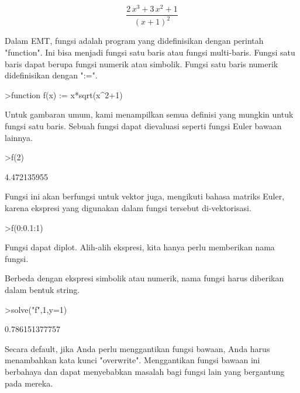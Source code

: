 \documentclass[12pt,arial,letterpaper]{book}
\begin{document}
\begin{eulercomment}
\begin{eulercomment}
\begin{eulerformula}
\[
\frac{2\,x^3+3\,x^2+1}{\left(x+1\right)^2}
\]
\end{eulerformula}
\begin{eulercomment}
Dalam EMT, fungsi adalah program yang didefinisikan dengan perintah
"function". Ini bisa menjadi fungsi satu baris atau fungsi
multi-baris. Fungsi satu baris dapat berupa fungsi numerik atau
simbolik. Fungsi satu baris numerik didefinisikan dengan ":=".
\end{eulercomment}
\begin{eulerprompt}
>function f(x) := x*sqrt(x^2+1)
\end{eulerprompt}
\begin{eulercomment}
Untuk gambaran umum, kami menampilkan semua definisi yang mungkin
untuk fungsi satu baris. Sebuah fungsi dapat dievaluasi seperti fungsi
Euler bawaan lainnya.
\end{eulercomment}
\begin{eulerprompt}
>f(2)
\end{eulerprompt}
\begin{euleroutput}
  4.472135955
\end{euleroutput}
\begin{eulercomment}
Fungsi ini akan berfungsi untuk vektor juga, mengikuti bahasa matriks
Euler, karena ekspresi yang digunakan dalam fungsi tersebut
di-vektorisasi.
\end{eulercomment}
\begin{eulerprompt}
>f(0:0.1:1)
\end{eulerprompt}
\begin{euleroutput}
  [0,  0.100499,  0.203961,  0.313209,  0.430813,  0.559017,  0.699714,
  0.854459,  1.0245,  1.21083,  1.41421]
\end{euleroutput}
\begin{eulercomment}
Fungsi dapat diplot. Alih-alih ekspresi, kita hanya perlu memberikan
nama fungsi.

Berbeda dengan ekspresi simbolik atau numerik, nama fungsi harus
diberikan dalam bentuk string.
\end{eulercomment}
\begin{eulerprompt}
>solve("f",1,y=1)
\end{eulerprompt}
\begin{euleroutput}
  0.786151377757
\end{euleroutput}
\begin{eulercomment}
Secara default, jika Anda perlu menggantikan fungsi bawaan, Anda harus
menambahkan kata kunci "overwrite". Menggantikan fungsi bawaan ini
berbahaya dan dapat menyebabkan masalah bagi fungsi lain yang
bergantung pada mereka.


\end{eulercomment}
\end{eulercomment}
\end{eulercomment}
\end{document}
